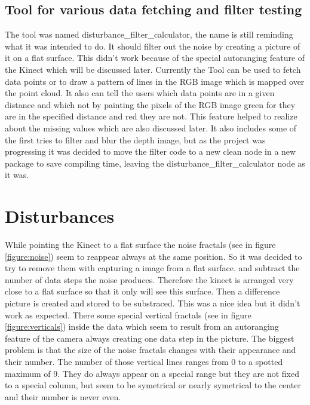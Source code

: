 \subsection{Tool for various data fetching and filter testing}
The tool was named disturbance\_filter\_calculator, the name is still reminding what it was intended to do. It should
filter out the noise by creating a picture of it on a flat surface. This didn't work because of the special autoranging
feature of the Kinect which will be discussed later. Currently the Tool can be used to fetch data points or to
draw a pattern of lines in the RGB image which is mapped over the point cloud. It also can tell the users which data points
are in a given distance and which not by painting the pixels of the RGB image green for they are in the specified distance
and red they are not. This feature helped to realize about the missing values which are also discussed later. It also includes
some of the first tries to filter and blur the depth image, but as the project was progressing it was decided to move the 
filter code to a new clean node in a new package to save compiling time, leaving the disturbance\_filter\_calculator 
node as it was.


\section{Disturbances}
While pointing the Kinect to a flat surface the noise fractals (see in figure \vref{figure:noise}) 
seem to reappear always at the same position. So it was decided to try to remove them with capturing a image from a flat surface.
and subtract the number of data steps the noise produces. Therefore the kinect is arranged very close to a flat surface 
so that it only will see this surface. Then a difference picture is created and stored to be substraced. 
This was a nice idea but it didn't work as expected. There some special vertical fractals (see in figure \vref{figure:verticals}) 
inside the data which seem to result from an autoranging feature of the camera always creating one data step in the picture. 
The biggest problem is that the size of the noise fractals changes with their appearance and their number. The number of
those vertical lines ranges from 0 to a spotted maximum of 9. They do always appear on a special range 
but they are not fixed to a special column, but seem to be symetrical or nearly symetrical to the center 
and their number is never even. 

